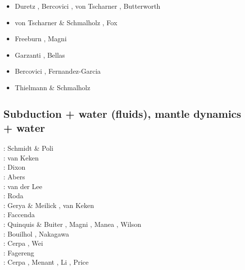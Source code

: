 \begin{scriptsize}
\begin{itemize}
\item[\twothousandfourteen] Duretz \etal \cite{dugs14}, Bercovici \etal \cite{besr14},
                            von Tscharner \etal \cite{vosd14}, Butterworth \etal \cite{butm14}
\item[\twothousandfifteen] von Tscharner \& Schmalholz \cite{vosc15}, Fox \etal \cite{fohk15}
\item[\twothousandseventeen] Freeburn \etal \cite{frbm17}, Magni \etal \cite{maav17}
\item[\twothousandeighteen] Garzanti \etal \cite{garm18}, Bellas \etal \cite{bezb18}
\item[\twothousandnineteen] Bercovici \etal \cite{beml19}, Fernandez-Garcia \etal \cite{fegb19}
\item[\twothousandtwenty] Thielmann \& Schmalholz \cite{thsc20}
\end{itemize}
\end{scriptsize}

\subsection{Subduction + water (fluids), mantle dynamics + water}

\begin{scriptsize}
\nineteenninetyeight: Schmidt \& Poli \cite{scpo98} \\
\twothousandtwo: van Keken \etal \cite{vakp02}\\
\twothousandfour: Dixon \etal \cite{didb04}\\
\twothousandsix: Abers \etal \cite{abvk06}\\
\twothousandeight: van der Lee \etal \cite{vary08}\\
\twothousandten: Roda \etal \cite{roms10}\\
\twothousandeleven: Gerya \& Meilick \cite{geme11}, van Keken \etal \cite{vahs11}\\
\twothousandtwelve: Faccenda \etal \cite{fagm12}\\
\twothousandfourteen: Quinquis \& Buiter \cite{qubu14}, Magni \etal \cite{mabv14}, 
                      Manea \etal \cite{malg14}, Wilson \etal \cite{wisv14}\\
\twothousandfifteen: Bouilhol \etal \cite{bomv15}, Nakagawa \etal \cite{nani15}\\
\twothousandseventeen: Cerpa \etal \cite{ceww17}, Wei \etal \cite{wewv17}\\
\twothousandeighteen: Fagereng \etal \cite{fade18}\\
\twothousandnineteen: Cerpa \etal \cite{ceww19}, Menant \etal \cite{meag19}, 
                      Li \etal \cite{ligc19}, Price \etal \cite{prdp19}
\end{scriptsize}

